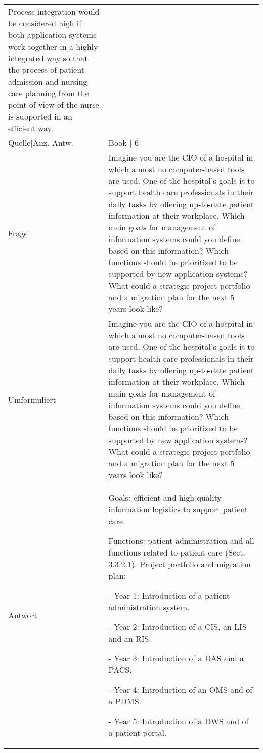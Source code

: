 {\begin{landscape}
\begin{longtable}{p{3cm}p{}}
    Process integration would be considered high if both application systems work together in a highly integrated way so that the process of patient admission and nursing care planning from the point of view of the nurse is supported in an efficient way.\\
    Quelle|Anz. Antw. &  Book  | 6 \\
    \midrule
    Frage & Imagine you are the CIO of a hospital in which almost no computer-based tools are used.
    One of the hospital's goals is to support health care professionals in their daily tasks by offering up-to-date patient information at their workplace.
    Which main goals for management of information systems could you define based on this information? Which functions should be prioritized to be supported by new application systems? What could a strategic project portfolio and a migration plan for the next 5 years look like? \\
    Umformuliert & Imagine you are the CIO of a hospital in which almost no computer-based tools are used.
    One of the hospital's goals is to support health care professionals in their daily tasks by offering up-to-date patient information at their workplace.
    Which main goals for management of information systems could you define based on this information? Which functions should be prioritized to be supported by new application systems? What could a strategic project portfolio and a migration plan for the next 5 years look like? \\
    Antwort & Goals: efficient and high-quality information logistics to support patient care.

    Functions: patient administration and all functions related to patient care (Sect. 3.3.2.1).
    Project portfolio and migration plan:

    - Year 1: Introduction of a patient administration system.

    - Year 2: Introduction of a CIS, an LIS and an RIS.

    - Year 3: Introduction of a DAS and a PACS.

    - Year 4: Introduction of an OMS and of a PDMS.

    - Year 5: Introduction of a DWS and of a patient portal.


\end{longtable}
\end{landscape}}
